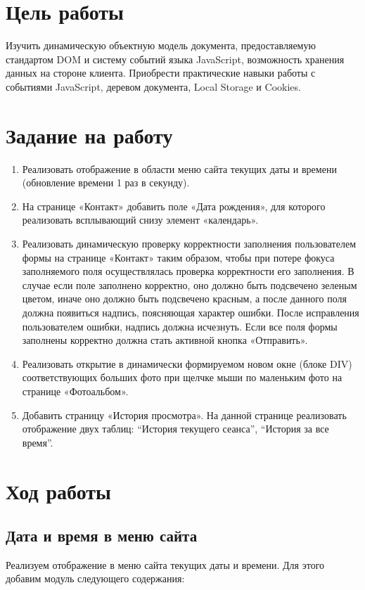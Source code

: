 \documentclass[a4paper,14pt]{extarticle}
\begin{document}


\section{Цель работы}
Изучить динамическую объектную модель документа, предоставляемую
стандартом DOM и систему событий языка JavaScript, возможность
хранения данных на стороне клиента. Приобрести практические навыки
работы с событиями JavaScript, деревом документа, Local Storage и
Cookies.

\section{Задание на работу}
\begin{enumerate}
    \item Реализовать отображение в области меню сайта текущих даты и
          времени (обновление времени 1 раз в секунду). 
    \item На странице «Контакт» добавить поле «Дата рождения», для
          которого реализовать всплывающий снизу элемент «календарь».
    \item Реализовать динамическую проверку корректности заполнения
          пользователем формы на странице «Контакт» таким образом, чтобы при
          потере фокуса заполняемого поля осуществлялась проверка корректности
          его заполнения. В случае если поле заполнено корректно, оно должно быть
          подсвечено зеленым цветом, иначе оно должно быть подсвечено красным,
          а после данного поля должна появиться надпись, поясняющая характер
          ошибки. После исправления пользователем ошибки, надпись должна исчезнуть. Если все поля формы заполнены корректно должна стать активной кнопка «Отправить».
    \item Реализовать открытие в динамически формируемом новом окне
          (блоке DIV) соответствующих больших фото при щелчке мыши
          по маленьким фото на странице «Фотоальбом».
    \item Добавить страницу «История просмотра». На данной странице
          реализовать отображение двух таблиц: \enquote{История текущего сеанса},
          \enquote{История за все время}.
\end{enumerate}

\section{Ход работы}
\subsection{Дата и время в меню сайта}
Реализуем отображение в меню сайта текущих даты и времени. Для этого добавим модуль следующего содержания:
\end{document}
